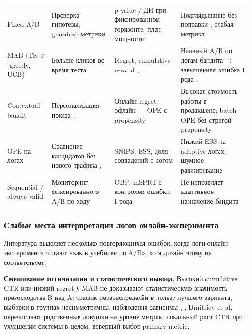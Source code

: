 \begingroup\footnotesize\setlength{\tabcolsep}{4pt}
\begin{xltabular}{\linewidth}{@{}
  >{\raggedright\arraybackslash}Y
  >{\raggedright\arraybackslash}Y
  >{\raggedright\arraybackslash}Y
  >{\raggedright\arraybackslash}Y@{}}
\toprule\noalign{}
\midrule\noalign{}
\endhead
\bottomrule\noalign{}
\endlastfoot
Fixed A/B & Проверка гипотезы, guardrail-метрики & p-value / ДИ при фиксированном горизонте, план мощности \cite{ref5} & Подглядывание без поправки \cite{ref19}; слабая метрика \cite{ref11} \\
MAB (TS, $\varepsilon$-greedy, UCB) & Больше кликов во время теста & Regret, cumulative reward \cite{ref12}, \cite{ref13} & Наивный A/B по логам бандита → завышенная ошибка I рода \cite{ref19}, \cite{ref21} \\
Contextual bandit & Персонализация показа \cite{ref6}, \cite{ref23} & Онлайн-regret; офлайн --- OPE с propensity & Высокая стоимость работы в продакшене; batch-OPE без строгой propensity \\
OPE на логах & Сравнение кандидатов без нового трафика \cite{ref24}, \cite{ref26} & SNIPS, ESS, доля совпадений с логом & Низкий ESS на adaptive-логах; шумное ранжирование \\
Sequential / always-valid & Мониторинг фиксированного A/B по ходу \cite{ref19} & OBF, mSPRT с контролем ошибки I рода & Не исправляет адаптивное назначение бандита \\
\end{xltabular}
\endgroup

\subsubsection{Слабые места интерпретации логов онлайн-эксперимента}\label{ux441ux43bux430ux431ux44bux435-ux43cux435ux441ux442ux430-ux438ux43dux442ux435ux440ux43fux440ux435ux442ux430ux446ux438ux438-ux43bux43eux433ux43eux432-ux43eux43dux43bux430ux439ux43d-ux44dux43aux441ux43fux435ux440ux438ux43cux435ux43dux442ux430}

Литература выделяет несколько повторяющихся ошибок, когда логи онлайн-эксперимента читают «как в учебнике по A/B», хотя дизайн этому не соответствует.

\textbf{Смешивание оптимизации и статистического вывода.} Высокий cumulative CTR или низкий regret у MAB не доказывают статистическую значимость превосходства B над A: трафик перераспределён в пользу лучшего варианта, выборки в группах несимметричны, наблюдения зависимы \cite{ref13}, \cite{ref21}. Dmitriev et al.~\cite{ref11} перечисляют родственные ловушки на уровне метрик: локальный рост CTR при ухудшении системы в целом, неверный выбор primary metric.

